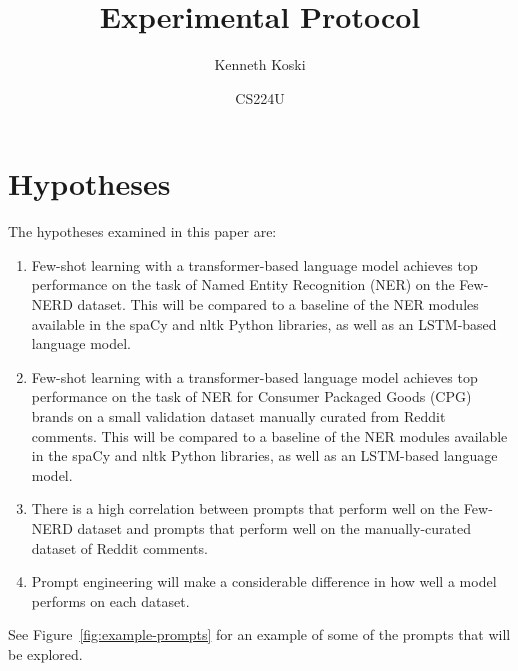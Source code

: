 \documentclass[a4paper, 11pt]{article}
\title{Experimental Protocol}
\author{Kenneth Koski}
\date{CS224U}
\begin{document}
\maketitle

\section{Hypotheses}

The hypotheses examined in this paper are:

\begin{enumerate}
\item Few-shot learning with a transformer-based language model achieves top performance on the task of Named Entity Recognition (NER) on the Few-NERD dataset\cite{few-nerd}. This will be compared to a baseline of the NER modules available in the spaCy and nltk Python libraries, as well as an LSTM-based language model.

\item Few-shot learning with a transformer-based language model achieves top performance on the task of NER for Consumer Packaged Goods (CPG) brands on a small validation dataset manually curated from Reddit comments. This will be compared to a baseline of the NER modules available in the spaCy and nltk Python libraries, as well as an LSTM-based language model.

\item There is a high correlation between prompts that perform well on the Few-NERD dataset and prompts that perform well on the manually-curated dataset of Reddit comments.

\item Prompt engineering will make a considerable difference in how well a model performs on each dataset.
\end{enumerate}

See Figure~\ref{fig:example-prompts} for an example of some of the prompts that will be explored.
\end{document}
